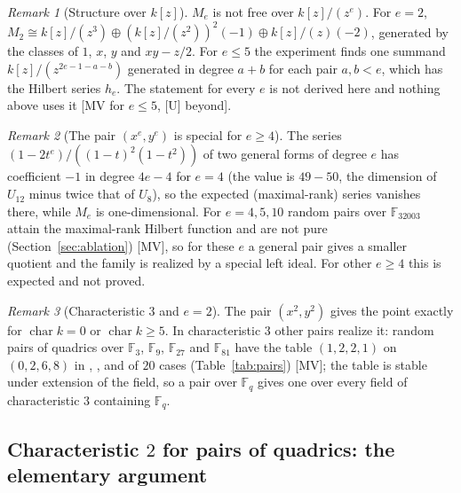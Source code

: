 \documentclass[11pt]{article}
\theoremstyle{definition}
\theoremstyle{remark}
\newtheorem{remark}{Remark}
\newcommand{\F}{\mathbb{F}}
\newcommand{\ch}{\operatorname{char}}
\begin{document}
\begin{remark}[{Structure over $k[z]$}]
$M_e$ is not free over $k[z]/(z^e)$. For $e=2$, $M_2\cong k[z]/(z^3)\oplus(k[z]/(z^2))^2(-1)\oplus k[z]/(z)(-2)$, generated by the classes of $1$, $x$, $y$ and $xy-z/2$. For $e\le5$ the experiment finds one summand $k[z]/(z^{2e-1-a-b})$ generated in degree $a+b$ for each pair $a,b<e$, which has the Hilbert series $h_e$. The statement for every $e$ is not derived here and nothing above uses it [MV for $e\le5$, [U] beyond].
\end{remark}

\begin{remark}[{The pair $(x^e,y^e)$ is special for $e\ge4$}]
The series $(1-2t^e)/((1-t)^2(1-t^2))$ of two general forms of degree $e$ has coefficient $-1$ in degree $4e-4$ for $e=4$ (the value is $49-50$, the dimension of $U_{12}$ minus twice that of $U_8$), so the expected (maximal-rank) series vanishes there, while $M_e$ is one-dimensional. For $e=4,5,10$ random pairs over $\F_{32003}$ attain the maximal-rank Hilbert function and are not pure (Section~\ref{sec:ablation}) [MV], so for these $e$ a general pair gives a smaller quotient and the family is realized by a special left ideal. For other $e\ge4$ this is expected and not proved.
\end{remark}

\begin{remark}[{Characteristic $3$ and $e=2$}]\label{rem:charthree}
The pair $(x^2,y^2)$ gives the point exactly for $\ch k=0$ or $\ch k\ge5$. In characteristic $3$ other pairs realize it: random pairs of quadrics over $\F_3$, $\F_9$, $\F_{27}$ and $\F_{81}$ have the table $(1,2,2,1)$ on $(0,2,6,8)$ in \ngfThreeHits, \ngfNineHits, \ngfTwentySevenHits{} and \ngfEightyOneHits{} of $20$ cases (Table~\ref{tab:pairs}) [MV]; the table is stable under extension of the field, so a pair over $\F_q$ gives one over every field of characteristic $3$ containing $\F_q$.
\end{remark}

\subsection{Characteristic \texorpdfstring{$2$}{2} for pairs of quadrics: the elementary argument}
\label{sec:thmB}
\end{document}
